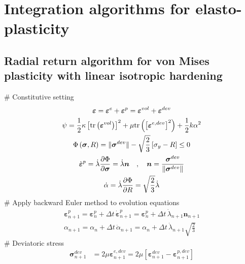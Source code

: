 \documentclass[]{scrartcl}
\begin{document}
\section{Integration algorithms for elasto-plasticity}
\subsection{Radial return algorithm for von Mises plasticity with linear isotropic hardening}
\begin{easylist}
# Constitutive setting
\begin{gather*}
\boldsymbol{\varepsilon}
  = \boldsymbol{\varepsilon}^{e} + \boldsymbol{\varepsilon}^{p}
  = \boldsymbol{\varepsilon}^{vol} + \boldsymbol{\varepsilon}^{dev} 
\\
\psi
  = \frac{1}{2} \kappa \left[ \textnormal{tr} \left( \boldsymbol{\varepsilon}^{vol} \right) \right]^{2}
  + \mu \textnormal{tr} \left( \left[\boldsymbol{\varepsilon}^{e, dev} \right]^{2} \right)
  + \frac{1}{2} k  \alpha^{2} 
\\
\Phi \left( \boldsymbol{\sigma}, R \right)
  = \Vert \boldsymbol{\sigma}^{dev} \Vert - \sqrt{\frac{2}{3}} \left[ \sigma_{y} - R \right]
    \leq 0
\\
\dot{\boldsymbol{\varepsilon}}^{p} 
  = \dot{\lambda} \frac{\partial \Phi}{\partial \boldsymbol{\sigma}}
  = \dot{\lambda} \boldsymbol{n}
\quad , \quad
\boldsymbol{n}
  = \dfrac{\boldsymbol{\sigma}^{dev}}{\Vert \boldsymbol{\sigma}^{dev} \Vert}
\\
\dot{\alpha} 
  = \dot{\lambda} \frac{\partial \Phi}{\partial R}
  = \sqrt{\frac{2}{3}} \dot{\lambda}
\end{gather*}
# Apply backward Euler method to evolution equations
\begin{gather*}
\boldsymbol{\varepsilon}^{p}_{n+1}
  = \boldsymbol{\varepsilon}^{p}_{n}
  + \Delta t \, \dot{\boldsymbol{\varepsilon}}^{p}_{n+1}
  = \boldsymbol{\varepsilon}^{p}_{n}
  + \Delta t \, \dot{\lambda}_{n+1} \boldsymbol{n}_{n+1}
\\ 
\alpha_{n+1}
  = \alpha_{n}
  + \Delta t \, \dot{\alpha}_{n+1}
  = \alpha_{n}
  + \Delta t \, \dot{\lambda}_{n+1} \sqrt{\frac{2}{3}}
\end{gather*}
# Deviatoric stress
\begin{align*}
\boldsymbol{\sigma}^{dev}_{n+1}
 & = 2 \mu \boldsymbol{\varepsilon}^{e, dev}_{n+1}
  = 2 \mu \left[ \boldsymbol{\varepsilon}^{dev}_{n+1} - \boldsymbol{\varepsilon}^{p, dev}_{n+1} \right] \\

\end{align*}
\end{easylist}
\end{document}
